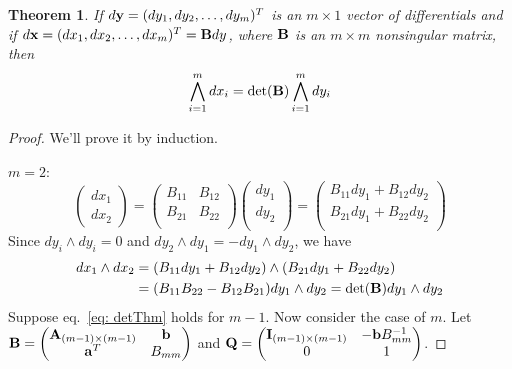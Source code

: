 \documentclass[11pt]{article}
\def\A{{\bf A}}
\def\a{{\bf a}}
\def\B{{\bf B}}
\def\b{{\bf b}}
\def\I{{\bf I}}
\def\Q{{\bf Q}}
\def\x{{\bf x}}
\def\y{{\bf y}}
\newtheorem{theorem}{Theorem}[section]
\begin{document}
\begin{theorem}
	If $d\y=(dy_1,dy_2,\dots, dy_m)^T$ is an $m\times 1$ vector of differentials and if $d\x=(dx_1,dx_2,\dots, dx_m)^T = \B dy$, where $\B$ is an $m\times m$ nonsingular matrix, then
	\begin{equation}	\label{eq: detThm}
		\bigwedge_{i=1}^m dx_i=\det(\B) \bigwedge_{i=1}^m dy_i
	\end{equation}
	
\end{theorem}
\begin{proof}
	We'll prove it by induction.

	 $m=2$:
	\begin {equation}
		\begin{pmatrix}dx_1\\ dx_2 \end{pmatrix} 
		=
		 \begin{pmatrix}
			B_{11} & B_{12}\\
			B_{21} & B_{22}\\
		\end{pmatrix}
		\begin{pmatrix}dy_1\\ dy_2\\ \end{pmatrix}
		=  \begin{pmatrix}
			B_{11}dy_1+ B_{12}dy_2\\
			B_{21}dy_1+ B_{22}dy_2\\
		     \end{pmatrix} 
	\end{equation}
	Since $dy_i\wedge dy_i=0$ and $dy_2\wedge dy_1=-dy_1\wedge dy_2$, we have
	\begin{align}
		dx_1\wedge dx_2 &= (B_{11}dy_1+ B_{12}dy_2)\wedge (B_{21}dy_1+ B_{22}dy_2) \\
		&= (B_{11}B_{22}-B_{12}B_{21})dy_1\wedge dy_2 = \det(\B) dy_1\wedge dy_2
	\end{align}
	Suppose eq.~\ref{eq: detThm} holds for $m-1$. Now consider the case of $m$.
	Let $\B=	\begin{pmatrix}
				\A_{(m-1)\times (m-1)} & \b\\
				\a^T 				 & B_{mm}\\
			\end{pmatrix}$
	and $\Q = 	\begin{pmatrix} 
				\I_{(m-1)\times (m-1)} & -\b B_{mm}^{-1}\\
				0				& 1\\
			\end{pmatrix}$.

\end{proof}
\end{document}
